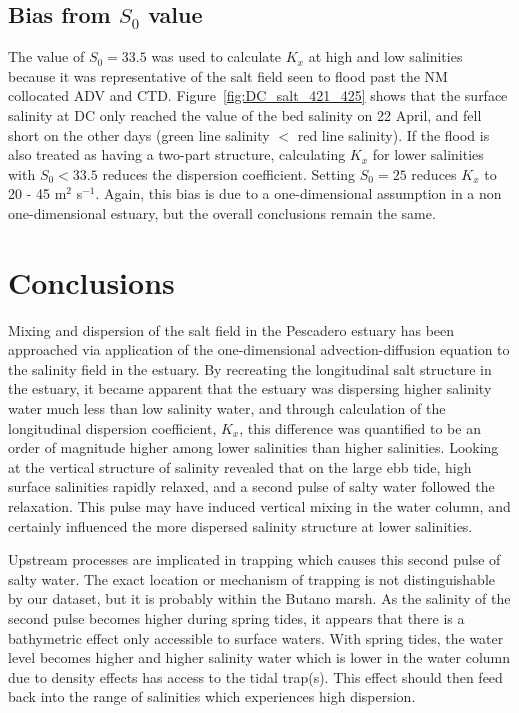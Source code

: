 \subsection{Bias from $S_0$ value}
The value of $S_0 = 33.5$ was used to calculate $K_x$ at high and low salinities because it was representative of the salt field seen to flood past the NM collocated ADV and CTD. Figure~\ref{fig:DC_salt_421_425} shows that the surface salinity at DC only reached the value of the bed salinity on 22 April, and fell short on the other days (green line salinity $<$ red line salinity). If the flood is also treated as having a two-part structure, calculating $K_x$ for lower salinities with $S_0<33.5$ reduces the dispersion coefficient. Setting $S_0=25$ reduces $K_x$ to 20 - 45 m$^2$ s$^{-1}$. Again, this bias is due to a one-dimensional assumption in a non one-dimensional estuary, but the overall conclusions remain the same. 

\section{Conclusions}

Mixing and dispersion of the salt field in the Pescadero estuary has been approached via application of the one-dimensional advection-diffusion equation to the salinity field in the estuary. By recreating the longitudinal salt structure in the estuary, it became apparent that the estuary was dispersing higher salinity water much less than low salinity water, and through calculation of the longitudinal dispersion coefficient, $K_x$, this difference was quantified to be an order of magnitude higher among lower salinities than higher salinities. Looking at the vertical structure of salinity revealed that on the large ebb tide, high surface salinities rapidly relaxed, and a second pulse of salty water followed the relaxation. This pulse may have induced vertical mixing in the water column, and certainly influenced the more dispersed salinity structure at lower salinities. 

Upstream processes are implicated in trapping which causes this second pulse of salty water.  The exact location or mechanism of trapping is not distinguishable by our dataset, but it is probably within the Butano marsh. As the salinity of the second pulse becomes higher during spring tides, it appears that there is a bathymetric effect only accessible to surface waters. With spring tides, the water level becomes higher and higher salinity water which is lower in the water column due to density effects has access to the tidal trap(s). This effect should then feed back into the range of salinities which experiences high dispersion.

